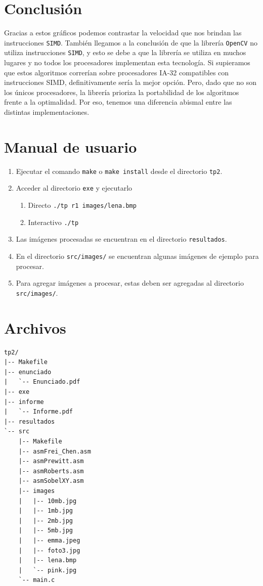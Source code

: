 \documentclass[a4paper, 10pt]{article}
\begin{document}
\section{Conclusi\'on}
Gracias a estos gr\'aficos podemos contrastar la velocidad que nos brindan las instrucciones \texttt{SIMD}.
Tambi\'en llegamos a la conclusi\'on de que la librer\'ia \texttt{OpenCV} no utiliza instrucciones \texttt{SIMD}, y esto se debe a que la librer\'ia se utiliza en muchos lugares y no todos los procesadores implementan esta tecnolog\'ia.
Si supieramos que estos algoritmos correr\'ian sobre procesadores IA-32 compatibles con instrucciones SIMD, definitivamente ser\'ia la mejor opci\'on.
Pero, dado que no son los \'unicos procesadores, la librer\'ia prioriza la portabilidad de los algoritmos frente a la optimalidad.
Por eso, tenemos una diferencia abismal entre las distintas implementaciones.

\newpage

\section{Manual de usuario}
\begin{enumerate}
	\item Ejecutar el comando \texttt{make} o \texttt{make install} desde el directorio \texttt{tp2}.
	\item Acceder al directorio \texttt{exe} y ejecutarlo
	\begin{enumerate}
		\item Directo \texttt{./tp r1 images/lena.bmp }
		\item Interactivo \texttt{./tp }
	\end{enumerate}	
	\item Las im\'agenes procesadas se encuentran en el directorio \texttt{resultados}.
	\item En el directorio \texttt{src/images/} se encuentran algunas im\'agenes de ejemplo para procesar.
	\item Para agregar im\'agenes a procesar, estas deben ser agregadas al directorio \texttt{src/images/}.

\end{enumerate}

\section*{Archivos}
\begin{lstlisting}[language=SHELXL]
tp2/
|-- Makefile
|-- enunciado
|   `-- Enunciado.pdf
|-- exe
|-- informe
|   `-- Informe.pdf
|-- resultados
`-- src
    |-- Makefile
    |-- asmFrei_Chen.asm
    |-- asmPrewitt.asm
    |-- asmRoberts.asm
    |-- asmSobelXY.asm
    |-- images
    |   |-- 10mb.jpg
    |   |-- 1mb.jpg
    |   |-- 2mb.jpg
    |   |-- 5mb.jpg
    |   |-- emma.jpeg
    |   |-- foto3.jpg
    |   |-- lena.bmp
    |   `-- pink.jpg
    `-- main.c

\end{lstlisting}
\end{document}
